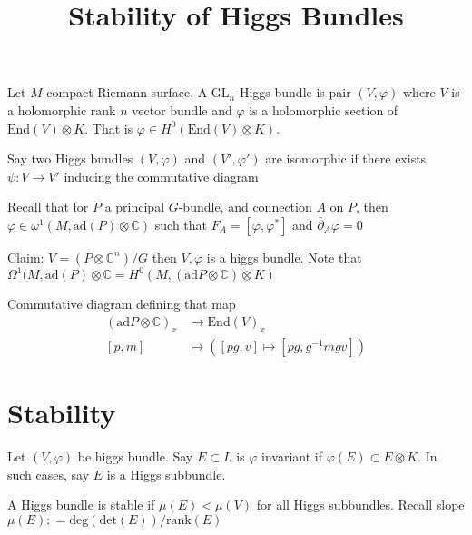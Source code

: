 % 

\title{Stability of Higgs Bundles}
\author{}
\date{}

 
\maketitle

\begin{definition}
Let $M$ compact Riemann surface. 
    A $\mathrm{GL}_n $-Higgs bundle is pair $(V, \varphi)$ 
    where $ V$ is a holomorphic rank $n$ vector bundle and 
    $ \varphi$ is a holomorphic section of $ \mathrm{End}(V) \otimes K $.
    That is $ \varphi \in H^0 ( \mathrm{End} (V) \otimes K) $.
\end{definition}

\begin{definition}
    Say two Higgs bundles $(V, \varphi) $ and $(V', \varphi')$ are isomorphic if 
    there exists $ \psi: V \rightarrow  V'$ inducing the commutative diagram
\end{definition}

Recall that for $P$ a principal $G$-bundle, 
and connection $A$ on $P$, 
then $ \varphi \in \omega^1 ( M , \mathrm{ad} ( P) \otimes \mathbb{C} ) $ 
such that $ F_ A = [ \varphi , \varphi ^* ] $ and $ \bar{\partial} _A \varphi = 0 $

Claim: $ V = (P \otimes \mathbb{C} ^n) / G $ then $V, \varphi$ is a higgs bundle. 
Note that $ \Omega^1 ( M, \mathrm{ad} ( P) \otimes \mathbb{C}  = H^0 ( M , ( \mathrm{ad} P \otimes \mathbb{C} ) \otimes K) $

Commutative diagram defining that map 
\begin{align}
    (\mathrm{ad}P \otimes \mathbb{C} )_x & \rightarrow  \mathrm{End}(V) _x \\
    [p, m ] & \mapsto ([pg, v] \mapsto [pg, g^{-1} m g v] ) 
\end{align}


\section{Stability} %

\begin{definition}
    Let $( V, \varphi) $ be higgs bundle. 
    Say $ E \subset L$ is $ \varphi$ invariant if $ \varphi(E) \subset E \otimes K$. 
    In such cases, say $E$ is a Higgs subbundle. 

    A Higgs bundle is stable if $\mu(E) < \mu(V) $ for all Higgs subbundles. 
    Recall slope $ \mu(E) : = \mathrm{deg} ( \mathrm{det}(E)) / \mathrm{rank}(E) $ 
\end{definition}

